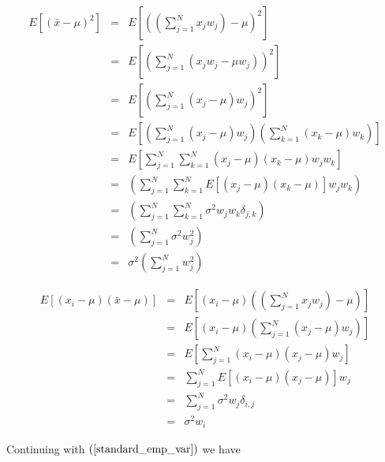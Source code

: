 \documentclass{article}
\begin{document}
\begin{eqnarray}
    E\left[ ({\bar x} - \mu)^2 \right] & = & E \left[\left( \left(\sum_{j=1}^N x_j w_j\right) - \mu \right)^2\right] \nonumber \\
     & = &  E\left[ \left( \sum_{j=1}^N (x_j w_j - \mu w_j) \right)^2\right] \nonumber \\
     & = &  E\left[ \left( \sum_{j=1}^N (x_j - \mu)w_j \right)^2\right] \nonumber \\
     & = &  E\left[ \left( \sum_{j=1}^N (x_j - \mu)w_j \right) \left(\sum_{k=1}^N (x_k - \mu) w_k\right)\right] \nonumber \\
     & = &  E\left[ \sum_{j=1}^N \sum_{k=1}^N  (x_j - \mu) (x_k - \mu) w_j w_k \right]  \nonumber \\
     & = &  \left( \sum_{j=1}^N \sum_{k=1}^N  E\left[(x_j - \mu) (x_k - \mu) \right]w_j w_k\right) \nonumber  \\
     & = &  \left( \sum_{j=1}^N \sum_{k=1}^N  \sigma^2 w_j w_k \delta_{j,k}\right) \nonumber  \\
     & = &  \left( \sum_{j=1}^N \sigma^2 w_j^2 \right)  \nonumber \\
     & = &  \sigma^2 \left( \sum_{j=1}^N w_j^2 \right)  
\end{eqnarray}

\begin{eqnarray}
    E\left[(x_i - \mu)({\bar x} - \mu)\right]  & = & E\left[ (x_i - \mu) \left( \left( \sum_{j=1}^N x_j w_j\right) - \mu \right)  \right] \nonumber \\ 
    & = & E\left[ (x_i - \mu) \left( \sum_{j=1}^N (x_j - \mu)w_j\right) \right] \nonumber \\ 
    & = & E\left[ \sum_{j=1}^N (x_i - \mu) (x_j - \mu)w_j \right] \nonumber \\ 
    & = & \sum_{j=1}^N E\left[(x_i - \mu) (x_j - \mu) \right] w_j \nonumber \\ 
    & = & \sum_{j=1}^N \sigma^2 w_j \delta_{i,j} \nonumber \\ 
    & = & \sigma^2 w_i  \nonumber 
\end{eqnarray}

Continuing with $(\ref{standard_emp_var})$ we have
\end{document}
